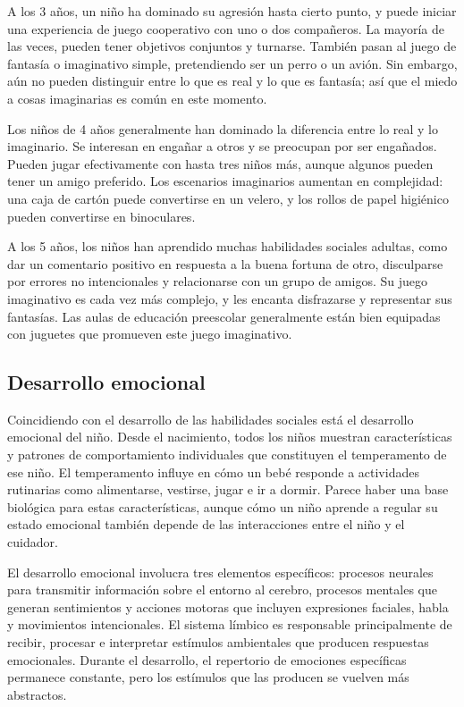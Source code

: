 \documentclass[11pt,letterpaper]{report}
\begin{document}
A los 3 años, un niño ha dominado su agresión hasta cierto punto, y puede
iniciar una experiencia de juego cooperativo con uno o dos compañeros. La
mayoría de las veces, pueden tener objetivos conjuntos y turnarse. También
pasan al juego de fantasía o imaginativo simple, pretendiendo ser un perro o un
avión. Sin embargo, aún no pueden distinguir entre lo que es real y lo que es
fantasía; así que el miedo a cosas imaginarias es común en este momento.
\cite{Gerber2011}

Los niños de 4 años generalmente han dominado la diferencia entre lo real y lo
imaginario. Se interesan en engañar a otros y se preocupan por ser engañados.
Pueden jugar efectivamente con hasta tres niños más, aunque algunos pueden
tener un amigo preferido. Los escenarios imaginarios aumentan en complejidad:
una caja de cartón puede convertirse en un velero, y los rollos de papel
higiénico pueden convertirse en binoculares. \cite{Gerber2011}

A los 5 años, los niños han aprendido muchas habilidades sociales adultas, como
dar un comentario positivo en respuesta a la buena fortuna de otro, disculparse
por errores no intencionales y relacionarse con un grupo de amigos. Su juego
imaginativo es cada vez más complejo, y les encanta disfrazarse y representar
sus fantasías. Las aulas de educación preescolar generalmente están bien
equipadas con juguetes que promueven este juego imaginativo. \cite{Gerber2011}

\subsection{Desarrollo emocional}
Coincidiendo con el desarrollo de las habilidades sociales está el desarrollo
emocional del niño. Desde el nacimiento, todos los niños muestran
características y patrones de comportamiento individuales que constituyen el
temperamento de ese niño. El temperamento influye en cómo un bebé responde a
actividades rutinarias como alimentarse, vestirse, jugar e ir a dormir. Parece
haber una base biológica para estas características, aunque cómo un niño
aprende a regular su estado emocional también depende de las interacciones
entre el niño y el cuidador. \cite{Gerber2011}

El desarrollo emocional involucra tres elementos específicos: procesos neurales
para transmitir información sobre el entorno al cerebro, procesos mentales que
generan sentimientos y acciones motoras que incluyen expresiones faciales,
habla y movimientos intencionales. El sistema límbico es responsable
principalmente de recibir, procesar e interpretar estímulos ambientales que
producen respuestas emocionales. Durante el desarrollo, el repertorio de
emociones específicas permanece constante, pero los estímulos que las producen
se vuelven más abstractos. \cite{Gerber2011}
\end{document}

